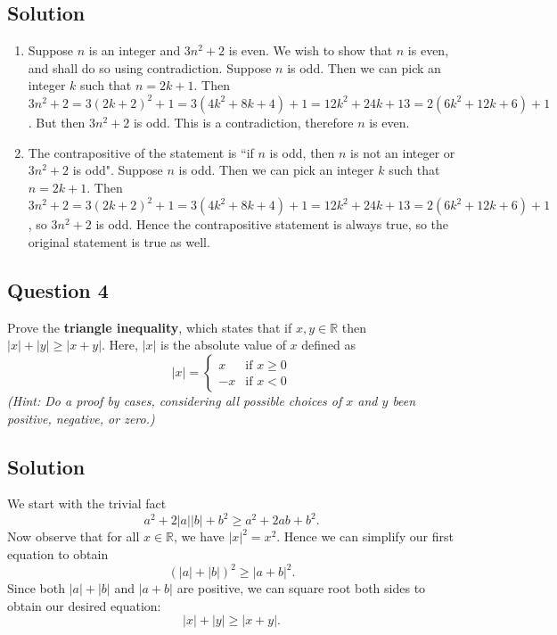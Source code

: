 \documentclass{article}
\begin{document}
\subsection*{Solution}
    \begin{enumerate}
        \item Suppose $n$ is an integer and $3n^2 + 2$ is even. We wish to show that $n$ is even, and shall do so using contradiction. Suppose $n$ is odd. Then we can pick an integer $k$ such that $n = 2k + 1$. Then $3n^2 + 2 = 3(2k + 2)^2 + 1 = 3(4k^2 + 8k + 4) + 1 = 12k^2 + 24k + 13 = 2(6k^2 + 12k + 6) + 1$. But then $3n^2 + 2$ is odd. This is a contradiction, therefore $n$ is even.
        \item The contrapositive of the statement is ``if $n$ is odd, then $n$ is not an integer or $3n^2 + 2$ is odd". Suppose $n$ is odd. Then we can pick an integer $k$ such that $n = 2k + 1$. Then $3n^2 + 2 = 3(2k + 2)^2 + 1 = 3(4k^2 + 8k + 4) + 1 = 12k^2 + 24k + 13 = 2(6k^2 + 12k + 6) + 1$, so $3n^2 + 2$ is odd. Hence the contrapositive statement is always true, so the original statement is true as well.
    \end{enumerate}

\subsection*{Question 4}
    Prove the \textbf{triangle inequality}, which states that if $x, y \in \mathbb{R}$ then $|x| + |y| \ge |x + y|$. Here, $|x|$ is the absolute value of $x$ defined as 
    $$|x| = 
    \begin{cases}
         x & \text{if } x \ge 0 \\
        -x & \text{if } x < 0
    \end{cases}$$
    \textit{(Hint: Do a proof by cases, considering all possible choices of $x$ and $y$ been positive, negative, or zero.)}

\subsection*{Solution}
    We start with the trivial fact $$a^2 + 2|a||b| + b^2 \ge a^2 + 2ab + b^2.$$ Now observe that for all $x \in \mathbb{R}$, we have $|x|^2 = x^2$. %
    Hence we can simplify our first equation to obtain $$(|a| + |b|)^2 \ge |a + b|^2.$$ Since both $|a| + |b|$ and $|a + b|$ are positive, we can square root both sides to obtain our desired equation: $$|x| + |y| \ge |x + y|.$$
\end{document}
